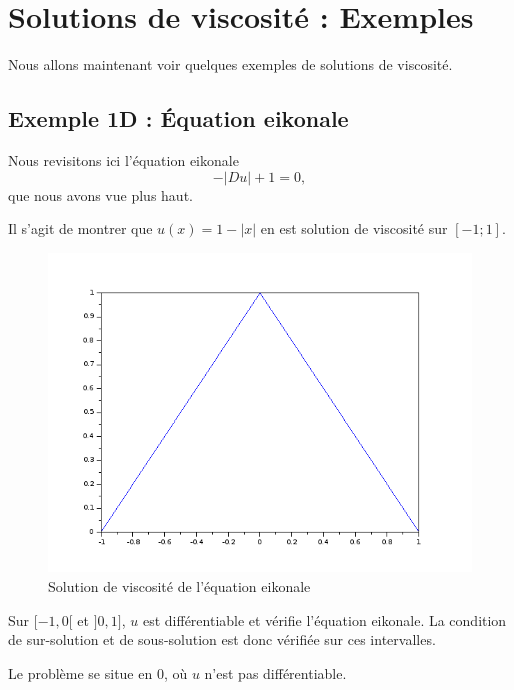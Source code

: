 \documentclass[12pt,a4paper,twoside]{article}
\begin{document}
\section{Solutions de viscosité : Exemples }

Nous allons maintenant voir quelques exemples de solutions de viscosité.

\subsection{Exemple 1D : Équation eikonale}

Nous revisitons ici l'équation eikonale 
\begin{equation} \label{eq:ek}
 - |Du| + 1 = 0, 
\end{equation}
que nous avons vue plus haut. 

Il s'agit de montrer que $u(x) = 1 - |x|$ en est solution de viscosité sur $ [-1;1]$.


\begin{figure}
\begin{center}
\includegraphics[scale=0.5]{Images/eikonale.png}
\caption{Solution de viscosité de l'équation eikonale}
\label{eikonale}
\end{center}
\end{figure}

Sur $[-1,0[$ et $]0,1]$, $u$ est différentiable et vérifie l'équation eikonale. La condition de
sur-solution et de sous-solution est donc vérifiée sur ces intervalles.

Le problème se situe en
0, où $u$ n'est pas différentiable.
\end{document}
